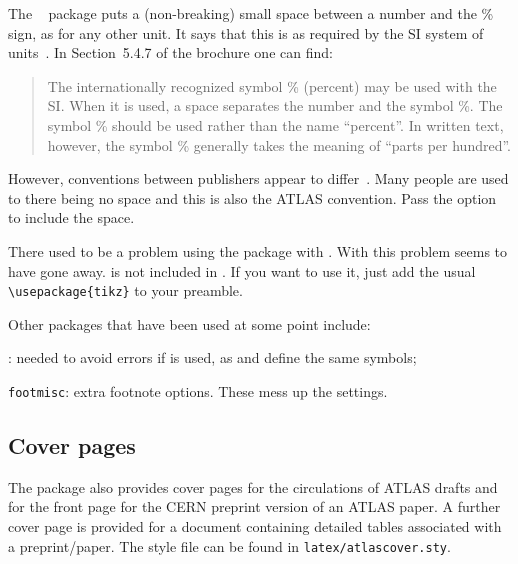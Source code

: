 The ~\cite{siunitx} package puts a (non-breaking) small space between a number and the \% sign,
as for any other unit.
It says that this is as required by the SI system of units~\cite{SI}.
In Section~5.4.7 of the brochure one can find:
\begin{quotation}
  The internationally recognized symbol \% (percent) may be used with the SI.
  When it is used, a space separates the number and the symbol \%.
  The symbol \% should be used rather than the name \enquote{percent}.
  In written text, however, the symbol \% generally takes the meaning of “parts per hundred”.
\end{quotation}
However, conventions between publishers appear to differ~\cite{percentspace}.
Many people are used to there being no space and this is also the ATLAS convention.
Pass the option  to include the space.

There used to be a problem using the  package with .
With  this problem seems to have gone away.
 is not included in .
If you want to use it, just add the usual \verb|\usepackage{tikz}| to your preamble.

Other packages that have been used at some point include:
\begin{description}\setlength{\parskip}{0pt}\setlength{\itemsep}{0pt}
\item {}: needed to avoid errors if  is used, 
  as  and  define the same symbols;
\item \texttt{footmisc}: extra footnote options. 
  These mess up the  settings.
\end{description}


\subsection{Cover pages}
\label{sec:cover}

The package also provides cover pages for the circulations of ATLAS drafts and 
for the front page for the CERN preprint version of an ATLAS paper.
A further cover page is provided for a document containing detailed tables associated with a preprint/paper.
The style file can be found in \texttt{latex/atlascover.sty}.

